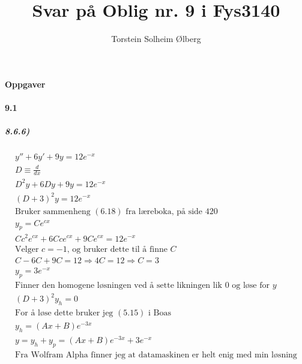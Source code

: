 \documentclass[11pt, A4paper,norsk]{article}
\author{Torstein Solheim Ølberg}
\title{Svar på Oblig nr. 9 i Fys3140}
\begin{document}
\maketitle
	\begin{center}
\Large \textbf{Oppgaver}
	\end{center}









		\paragraph{9.1}
			\subparagraph{8.6.6)}
				\begin{gather*}
y'' + 6y' + 9y = 12 e^{-x} \\
D \equiv \frac{d}{dx} \\
D^2 y + 6 D y + 9 y = 12 e^{-x} \\
(D + 3)^2 y = 12 e^{-x} \\
\text{Bruker sammenheng $(6.18)$ fra læreboka, på side 420} \\
y_p = Ce^{cx} \\
C c^2 e^{cx} + 6 C c e^{cx} + 9 C e^{cx} = 12 e^{-x} \\
\text{Velger $c = -1$, og bruker dette til å finne $C$} \\
C - 6C + 9C = 12 \Rightarrow 4C = 12 \Rightarrow C = 3 \\
y_p = 3 e^{-x} \\
\text{Finner den homogene løsningen ved å sette likningen lik $0$ og løse for $y$} \\
(D + 3)^2 y_h = 0 \\
\text{For å løse dette bruker jeg $(5.15)$ i Boas} \\
y_h = (A x + B)e^{- 3 x} \\
y = y_h + y_p = (A x + B)e^{- 3 x} + 3 e^{-x} \\
\text{Fra Wolfram Alpha finner jeg at datamaskinen er helt enig med min løsning}
				\end{gather*}
\end{document}
